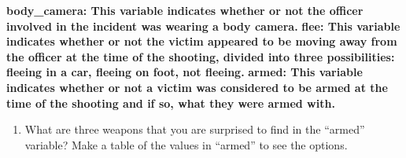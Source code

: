 \documentclass[
]{article}
\newenvironment{Shaded}{\begin{snugshade}}{\end{snugshade}}
\newcommand{\FunctionTok}[1]{\textcolor[rgb]{0.00,0.00,0.00}{#1}}
\newcommand{\NormalTok}[1]{#1}
\newcommand{\OtherTok}[1]{\textcolor[rgb]{0.56,0.35,0.01}{#1}}
\newcommand{\SpecialCharTok}[1]{\textcolor[rgb]{0.00,0.00,0.00}{#1}}
\providecommand{\tightlist}{%
  \setlength{\itemsep}{0pt}\setlength{\parskip}{0pt}}
\begin{document}
\textbf{body\_camera: This variable indicates whether or not the officer
involved in the incident was wearing a body camera.} \textbf{flee: This
variable indicates whether or not the victim appeared to be moving away
from the officer at the time of the shooting, divided into three
possibilities: fleeing in a car, fleeing on foot, not fleeing.}
\textbf{armed: This variable indicates whether or not a victim was
considered to be armed at the time of the shooting and if so, what they
were armed with.}

\begin{enumerate}
\def\labelenumi{\alph{enumi}.}
\setcounter{enumi}{3}
\tightlist
\item
  What are three weapons that you are surprised to find in the ``armed''
  variable? Make a table of the values in ``armed'' to see the options.
\end{enumerate}

\begin{Shaded}
\end{Shaded}
\end{document}
